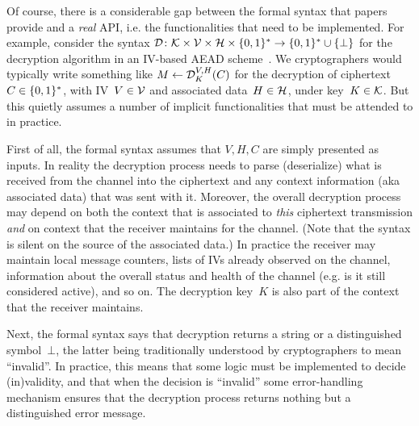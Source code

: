 %
Of course, there is a considerable gap between the formal syntax that papers
provide and a \emph{real} API, i.e. the functionalities that need to be
implemented.  For example, consider the syntax $\mathcal{D}\colon\mathcal{K}
\times \mathcal{V} \times \mathcal{H} \times \{0,1\}^*
\to \{0,1\}^* \cup \{\bot\}$ for the decryption
algorithm in an IV-based AEAD scheme~\cite{NPS14}.  We cryptographers would typically write something
like $M \gets \mathcal{D}^{V,H}_K(C)$ for the decryption of
ciphertext~$C\in\{0,1\}^*$, with IV~$V \in \mathcal{V}$ and
associated data~$H \in \mathcal{H}$, under key~$K \in \mathcal{K}$.  But this quietly
assumes a number of implicit functionalities that must be attended to in
practice.

First of all, the formal syntax assumes that $V,H,C$ are simply presented as
inputs.  In reality the decryption process needs to parse
(deserialize) what is received from
the channel into the ciphertext and any context information (aka associated
data) that was sent with it.  Moreover, the
overall decryption process may depend on both the context that is associated to
\emph{this} ciphertext transmission \emph{and} on context that the receiver maintains
for the channel. (Note that the syntax is silent on the source of the associated
data.)  In practice the receiver may maintain local message counters, lists of
IVs already observed on the channel, information about the overall status and
health of the channel (e.g. is it still considered active), and so on.  The
decryption key~$K$ is also part of the context that the receiver maintains.

Next, the formal syntax says that decryption returns a
string or a distinguished symbol~$\bot$, the latter being traditionally
understood by cryptographers to mean ``invalid''.  In practice, this means that
some logic must be implemented to decide (in)validity, and that when the
decision is ``invalid'' some error-handling mechanism ensures that the
decryption process returns nothing but a distinguished error message.

